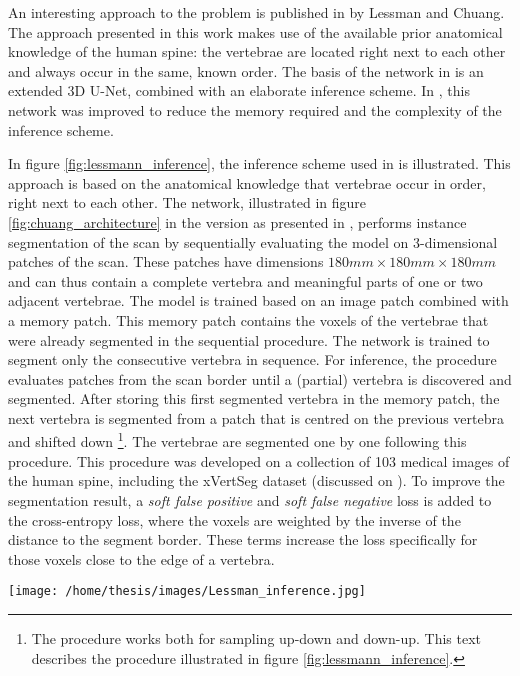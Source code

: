 \par{
    An interesting approach to the problem is published in \cite{Lessmann2018, Chuang2019} by Lessman and Chuang. 
    The approach presented in this work makes use of the available prior anatomical knowledge of the human spine: 
    the vertebrae are located right next to each other and always occur in the same, known order.  
    The basis of the network in \cite{Lessmann2018} is an extended 3D U-Net, combined with an elaborate inference scheme.
    In \cite{Chuang2019}, this network was improved to reduce the memory required and the complexity of the inference scheme.
}
\par{
    In figure \ref{fig:lessmann_inference}, the inference scheme used in \cite{Lessmann2018} is illustrated.
    This approach is based on the anatomical knowledge that vertebrae occur in order, right next to each other.
    The network, illustrated in figure \ref{fig:chuang_architecture} in the version as presented in \cite{Chuang2019}, 
    performs instance segmentation of the scan by sequentially evaluating the model on 3-dimensional patches of the scan. 
    These patches have dimensions $180mm \times 180mm \times 180mm$ and can thus contain a complete vertebra and meaningful parts of one or two adjacent vertebrae.
    The model is trained based on an image patch combined with a memory patch. This memory patch contains the voxels of the vertebrae that were already segmented in the sequential procedure.
    The network is trained to segment only the consecutive vertebra in sequence.
    For inference, the procedure evaluates patches from the scan border until a (partial) vertebra is discovered and segmented.
    After storing this first segmented vertebra in the memory patch, the next vertebra is segmented from a patch that is centred on the previous vertebra and shifted down
    \footnote{The procedure works both for sampling up-down and down-up. This text describes the procedure illustrated in figure \ref{fig:lessmann_inference}.}.
    The vertebrae are segmented one by one following this procedure.
    This procedure was developed on a collection of 103 medical images of the human spine, including the xVertSeg dataset (discussed on \pageref{sec:xVertSeg}). 
    To improve the segmentation result, a \textit{soft false positive} and \textit{soft false negative} loss is added to the cross-entropy loss, where the voxels are weighted by the inverse of the distance to the segment border. 
    These terms increase the loss specifically for those voxels close to the edge of a vertebra.
}
\begin{SCfigure}[][htb]
    \texttt{[image: /home/thesis/images/Lessman\_inference.jpg]}
    \caption{Illustration of the inference scheme used in \cite{Lessmann2018} (image taken from same). }
    \label{fig:lessmann_inference}
\end{SCfigure}
